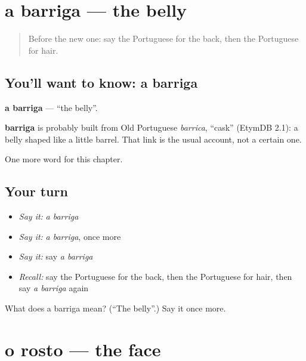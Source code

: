 \section[a barriga]{a barriga — the belly}

\label{lesson:PT-C32-barriga}



\begin{quote}
Before the new one: say the Portuguese for the back, then the Portuguese for hair.
\end{quote}

\subsection*{You'll want to know: a barriga}
\textbf{a barriga} — \textquotedblleft{}the belly\textquotedblright{}.

\begin{cousinweb}
\textbf{barriga} is probably built from Old Portuguese \emph{barrica}, \textquotedblleft{}cask\textquotedblright{} (EtymDB 2.1): a belly shaped like a little barrel. That link is the usual account, not a certain one.
\end{cousinweb}

\begin{grammarlens}[title={What you've built}]
One more word for this chapter.
\end{grammarlens}

\subsection*{Your turn}
\begin{itemize}
\raggedright
  \item \emph{Say it:} \emph{a barriga}
  \item \emph{Say it:} \emph{a barriga}, once more
  \item \emph{Say it:} say \emph{a barriga}
  \item \emph{Recall:} say the Portuguese for the back, then the Portuguese for hair, then say \emph{a barriga} again
\end{itemize}

\begin{tcolorbox}[breakable,colback=teal!4,colframe=teal!35!black,title={Before you move on}]
What does a barriga mean? (\textquotedblleft{}The belly\textquotedblright{}.) Say it once more.
\end{tcolorbox}
\section[o rosto]{o rosto — the face}


